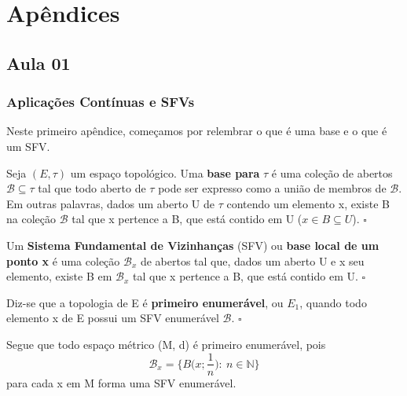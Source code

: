 \documentclass[../distribution_theory_notes.tex]{subfiles}
\begin{document}
\section*{Apêndices}
\subsection*{Aula 01}
\subsubsection*{Aplicações Contínuas e SFVs}
Neste primeiro apêndice, começamos por relembrar o que é uma base e o que é um SFV.

\begin{def*}
	Seja \((E, \tau )\) um espaço topológico. Uma \textbf{base para} \(\tau \) é uma coleção de abertos \(\mathcal{B}\subseteq \tau \) tal que todo aberto de \(\tau \) pode ser expresso como
	a união de membros de \(\mathcal{B}\). Em outras palavras, dados um aberto U de \(\tau \) contendo um elemento x, existe B na coleção \(\mathcal{B}\) tal que x pertence a B, que está contido em U (\(x\in B\subseteq U\)). \(\square\)
\end{def*}

\hypertarget{sistema_fundamental_vizinhas}{\begin{def*}
		Um \textbf{Sistema Fundamental de Vizinhanças} (SFV) ou \textbf{base local de um ponto x} é uma coleção \(\mathcal{B}_{x}\) de abertos tal que, dados um aberto U e x seu elemento, existe B em \(\mathcal{B}_{x}\) tal que x pertence a B, que está contido em U. \(\square\)
	\end{def*}}

\begin{def*}
	Diz-se que a topologia de E é \textbf{primeiro enumerável}, ou \(E_{1}\), quando todo elemento x de E possui um SFV enumerável \(\mathcal{B}\). \(\square\)
\end{def*}

Segue que todo espaço métrico (M, d) é primeiro enumerável, pois
\[
	\mathcal{B}_{x}=\biggl\{B \biggl(x; \frac{1}{n}\biggr):\: n\in \mathbb{N}\biggr\}
\]
para cada x em M forma uma SFV enumerável.
\end{document}
